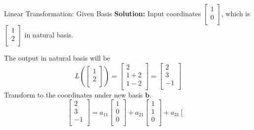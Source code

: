 \documentclass{beamer}
\begin{document}
\begin{frame}{Linear Transformation: Given Basis}
\textbf{Solution:}\newline
Input coordinates $\left[ \begin{array}{c}
    1\\
    0\\
\end{array} \right]$, which is $\left[ \begin{array}{c}
    1\\
    2\\
\end{array} \right]$ in natural basis.

The output in natural basis will be
\begin{equation*}
    L\left( \left[ \begin{array}{c}
        1\\
        2\\
    \end{array} \right] \right) =\left[ \begin{array}{c}
        2\\
        1+2\\
        1-2\\
    \end{array} \right] =\left[ \begin{array}{c}
        2\\
        3\\
        -1\\
    \end{array} \right]
\end{equation*}
Transform to the coordinates under new basis $\mathbf{b}$.
\begin{equation*}
    \left[ \begin{array}{c}
        2\\
        3\\
        -1\\
    \end{array} \right] =a_{11}\left[ \begin{array}{c}
        1\\
        0\\
        0\\
    \end{array} \right] +a_{21}\left[ \begin{array}{c}
        1\\
        1\\
        0\\
    \end{array} \right] +a_{31}\left[ \begin{array}{c}

\end{array}
\end{equation*}
\end{frame}
\end{document}
